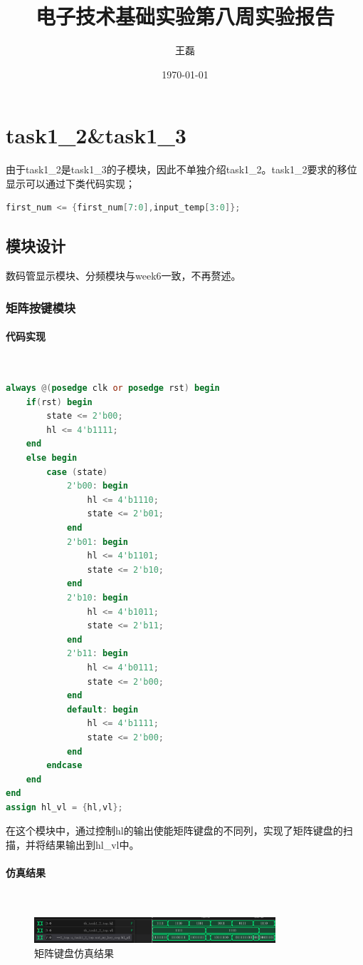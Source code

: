 \documentclass[UTF8]{ctexart}
\title{电子技术基础实验第八周实验报告}
\author{王磊\quad2022012972}
\date{\today}
\newcommand{\subsubsubsection}[1]{\paragraph{#1}\mbox{}\\}
\begin{document}
\maketitle
\section{task1\_2\&task1\_3}
由于task1\_2是task1\_3的子模块，因此不单独介绍task1\_2。task1\_2要求的移位显示可以通过下类代码实现；
\begin{framed}
    \begin{lstlisting}[language=verilog,style=verilogStyle]
        first_num <= {first_num[7:0],input_temp[3:0]};
    \end{lstlisting}
\end{framed}
\subsection{模块设计}
数码管显示模块、分频模块与week6一致，不再赘述。
\subsubsection{矩阵按键模块}
\subsubsubsection{代码实现}
\begin{framed}
    \begin{lstlisting}[language=verilog,style=verilogStyle]
always @(posedge clk or posedge rst) begin
    if(rst) begin
        state <= 2'b00; 
		hl <= 4'b1111;
    end
    else begin
        case (state)
            2'b00: begin
				hl <= 4'b1110;
                state <= 2'b01;
            end
            2'b01: begin
				hl <= 4'b1101;
                state <= 2'b10;
            end
            2'b10: begin
				hl <= 4'b1011;
                state <= 2'b11;
            end
            2'b11: begin
				hl <= 4'b0111;
                state <= 2'b00;
            end
            default: begin
				hl <= 4'b1111;
                state <= 2'b00;
            end
        endcase
    end
end 
assign hl_vl = {hl,vl};  
    \end{lstlisting}
\end{framed}
在这个模块中，通过控制hl的输出使能矩阵键盘的不同列，实现了矩阵键盘的扫描，并将结果输出到hl\_vl中。
\subsubsubsection{仿真结果}
\begin{figure}[H]
    \centering
    \includegraphics[width=0.8\textwidth]{task1_3_1.png}
    \caption{矩阵键盘仿真结果}
\end{figure}
\end{document}
